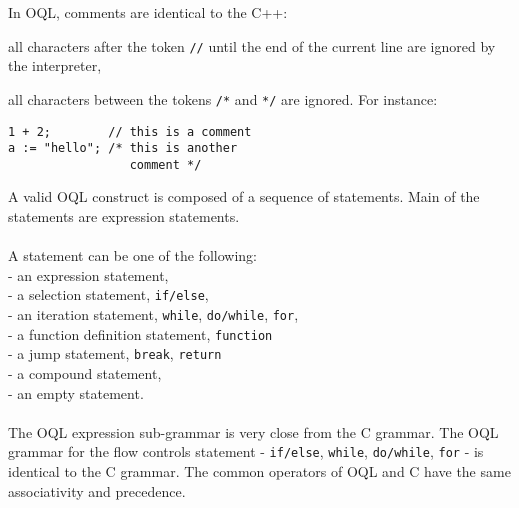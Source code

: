 In OQL, comments are identical to the C++:
\bi
\item all characters after the token \texttt{//} until the end of the current
line are ignored by the interpreter,
\item all characters between the tokens \texttt{/*} and \texttt{*/} are
ignored.
\ei
For instance:
\verbsize
\begin{verbatim}
1 + 2;        // this is a comment
a := "hello"; /* this is another
                 comment */
\end{verbatim}
\normalsize
{}
A valid OQL construct is composed of a sequence of statements. Main of
the statements are expression statements.
\\
\\
A statement can be one of the following:\\
\ixy - an expression statement,\\
\ixy - a selection statement, \texttt{if/else},\\
\ixy - an iteration statement, \texttt{while}, \texttt{do/while}, \texttt{for},\\
\ixy - a function definition statement, \texttt{function}\\
\ixy - a jump statement, \texttt{break}, \texttt{return}\\
\ixy - a compound statement,\\
\ixy - an empty statement.\\
\\
The OQL expression sub-grammar is very close from the C grammar. The
OQL grammar for the flow controls statement - \texttt{if/else}, 
\texttt{while}, \texttt{do/while}, \texttt{for} - is identical to the C
grammar. The common operators of OQL and C have the same associativity
and precedence.

